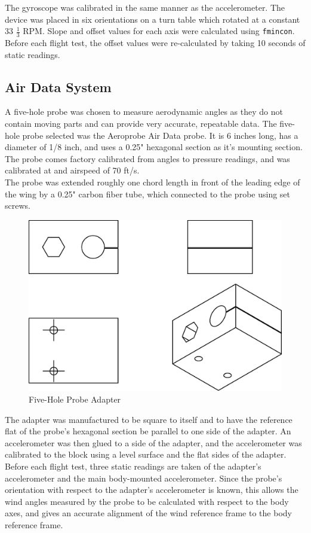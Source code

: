 The gyroscope was calibrated in the same manner as the accelerometer. The device was placed in six orientations on a turn table which rotated at a constant 33 $\frac{1}{3}$ RPM. Slope and offset values for each axis were calculated using \texttt{fmincon}. Before each flight test, the offset values were re-calculated by taking 10 seconds of static readings.\\

\subsection*{Air Data System}
A five-hole probe was chosen to measure aerodynamic angles as they do not contain moving parts and can provide very accurate, repeatable data. The five-hole probe selected was the Aeroprobe Air Data probe. It is 6 inches long, has a diameter of 1/8 inch, and uses a 0.25" hexagonal section as it's mounting section. The probe comes factory calibrated from angles to pressure readings, and was calibrated at and airspeed of 70 ft/s.\\
The probe was extended roughly one chord length in front of the leading edge of the wing by a 0.25" carbon fiber tube, which connected to the probe using set screws.
\begin{figure}[H]

  \centering
    \includegraphics[width=.5\textwidth]{figures/probeAdapter.eps}
      \caption{Five-Hole Probe Adapter} \label{fig:probeAdapter}
\end{figure}
The adapter was manufactured to be square to itself and to have the reference flat of the probe's hexagonal section be parallel to one side of the adapter. An accelerometer was then glued to a side of the adapter, and the accelerometer was calibrated to the block using a level surface and the flat sides of the adapter. Before each flight test, three static readings are taken of the adapter's accelerometer and the main body-mounted accelerometer. Since the probe's orientation with respect to the adapter's accelerometer is known, this allows the wind angles measured by the probe to be calculated with respect to the body axes, and gives an accurate alignment of the wind reference frame to the body reference frame.\\

